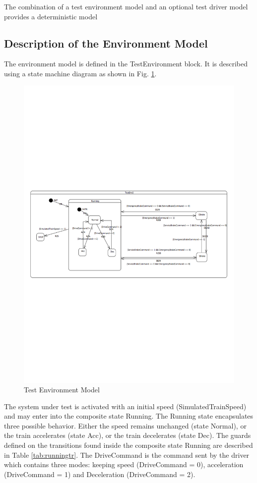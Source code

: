 The combination of a test environment model and an optional test driver
model provides a deterministic model

\subsection{Description of the Environment Model}
The environment model is defined in the TestEnvironment block. It is
described using a state machine diagram as shown in
Fig. \ref{fig:env}.

\begin{figure}[ht!]
	\centering
	\includegraphics[height=1\textheight]{figures/env}
	\caption{Test Environment Model}
    \label{fig:env}
\end{figure}

The system under test is activated with an initial speed
(SimulatedTrainSpeed) and may enter into the composite state Running.
The Running state encapsulates three possible behavior. Either the
speed remains unchanged (state Normal), or the train accelerates
(state Acc), or the train decelerates (state Dec). The guards defined
on the transitions found inside the composite state Running are
described in Table \ref{tab:runningtr}. The DriveCommand is the
command sent by the driver which contains three modes: keeping speed
(DriveCommand = 0), acceleration (DriveCommand = 1) and Deceleration
(DriveCommand = 2).

